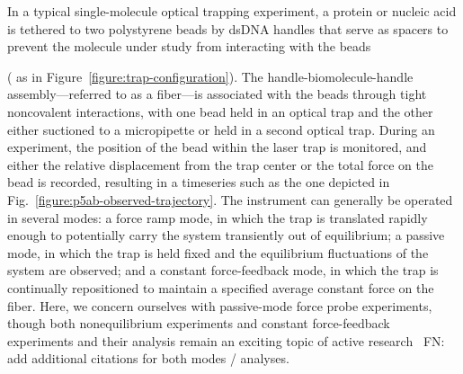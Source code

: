 \documentclass[aps,pre,twocolumn,superscriptaddress,nofootinbib,longbibliography]{revtex4-1}
\begin{document}
In a typical single-molecule optical trapping experiment, a protein or nucleic acid is tethered to two polystyrene beads by dsDNA handles that {\color{red}serve as spacers to} prevent the molecule under study from interacting with the beads {({\color{red} as in Figure~\ref{figure:trap-configuration})}.
The handle-biomolecule-handle assembly---referred to as a fiber---is associated with the beads through tight noncovalent interactions, with one bead held in an optical trap and the other either suctioned to a micropipette or held in a second optical trap.
During an experiment, the position of the bead within the laser trap is monitored, and either the relative displacement from the trap center or the total force on the bead is recorded, resulting in a timeseries such as the one depicted in Fig.~\ref{figure:p5ab-observed-trajectory}.
{\color{red}The instrument can generally be operated in several modes: a force ramp mode, in which the trap is translated rapidly enough to potentially carry the system {\color{red}transiently} out of equilibrium; a passive mode, in which the trap is held fixed and the equilibrium fluctuations of the system are observed; and a constant force-feedback mode, in which the trap is continually repositioned to maintain a specified average constant force on the fiber.}
Here, we concern ourselves with passive-mode force probe experiments, though both nonequilibrium experiments and constant force-feedback experiments and their analysis remain an exciting topic of active research~\cite{ritort:adv-chem-phys:2008:nonequilibrium-review}
{\color{magenta}FN: add additional citations for both modes / analyses}.

}
\end{document}
